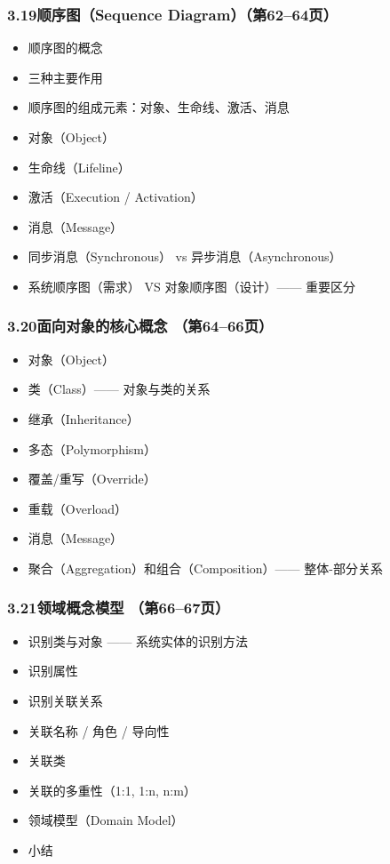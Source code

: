 \documentclass[12pt,a4paper]{ctexart}
\begin{document}
\subsubsection{3.19\quad 顺序图（Sequence Diagram）\hfill（第62--64页）}
\begin{itemize}
    \item 顺序图的概念
    \item 三种主要作用
    \item 顺序图的组成元素：对象、生命线、激活、消息
    \item 对象（Object）
    \item 生命线（Lifeline）
    \item 激活（Execution / Activation）
    \item 消息（Message）
    \item 同步消息（Synchronous） vs 异步消息（Asynchronous）
    \item 系统顺序图（需求） VS 对象顺序图（设计）—— 重要区分
\end{itemize}

\subsubsection{3.20\quad 面向对象的核心概念 \hfill（第64--66页）}
\begin{itemize}
    \item 对象（Object）
    \item 类（Class）—— 对象与类的关系
    \item 继承（Inheritance）
    \item 多态（Polymorphism）
    \item 覆盖/重写（Override）
    \item 重载（Overload）
    \item 消息（Message）
    \item 聚合（Aggregation）和组合（Composition）—— 整体-部分关系
\end{itemize}

\subsubsection{3.21\quad 领域概念模型 \hfill（第66--67页）}
\begin{itemize}
    \item 识别类与对象 —— 系统实体的识别方法
    \item 识别属性
    \item 识别关联关系
    \item 关联名称 / 角色 / 导向性
    \item 关联类
    \item 关联的多重性（1:1, 1:n, n:m）
    \item 领域模型（Domain Model）
    \item 小结
\end{itemize}
\end{document}
